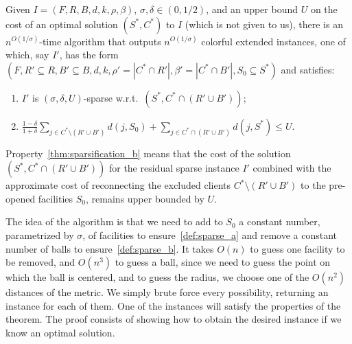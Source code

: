 \documentclass[a4paper,11pt]{article}
\begin{document}
\begin{theorem}[Sparsification]
\label{thm:sparsification}
Given $I = (F, R, B, d, k, \rho, \beta)$, $\sigma, \delta \in (0, 1/2)$,
and an upper bound $U$ on the cost of an optimal solution
$(S^*, C^*)$ to $I$ (which is not given to us), there is an
$n^{O(1/\sigma)}$-time algorithm that outputs $n^{O(1/\sigma)}$ colorful
extended instances, one of which, say $I'$, has the form $(F, R'
\subseteq R, B' \subseteq B, d, k, \rho' = |C^* \cap R'|, \beta' = |C^*
\cap B'|, S_0 \subseteq S^*)$ and satisfies:
\begin{enumerate}[label=\alph*), ref=\thetheorem\alph*]
\item \label{thm:sparsification_a} $I'$ is $(\sigma, \delta, U)$-sparse
w.r.t.\ $(S^*, C^* \cap (R' \cup B'))$;
\item \label{thm:sparsification_b} $\frac{1-\delta}{1+\delta} \sum_{j
\in C^* \setminus (R' \cup B')} d(j, S_0) + \sum_{j \in C^* \cap (R' \cup
B')} d(j, S^*) \leq U$.
\end{enumerate}
\end{theorem}

Property~\ref{thm:sparsification_b} means that the cost of the solution
$(S^*, C^* \cap (R' \cup B'))$ for the residual sparse instance $I'$
combined with the approximate cost of reconnecting the excluded clients
$C^* \setminus (R' \cup B')$ to the pre-opened facilities $S_0$, remains
upper bounded by $U$.

The idea of the algorithm is that we need to add to $S_0$ a constant number, parametrized
by $\sigma$, of facilities to ensure~\ref{def:sparse_a} and remove a
constant number of balls to ensure~\ref{def:sparse_b}. It takes $O(n)$
to guess one facility to be removed, and $O(n^3)$ to guess a ball, since
we need to guess the point on which the ball is centered, and to guess
the radius, we choose one of the $O(n^2)$ distances of the metric. We
simply brute force every possibility, returning an instance for each of
them. One of the instances will satisfy the properties of the theorem.
The proof consists of showing how to obtain the desired instance if we
know an optimal solution.
\end{document}
